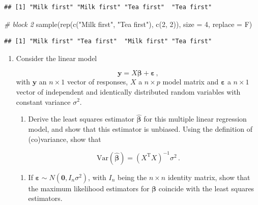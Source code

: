 \documentclass[
]{book}
\newenvironment{Shaded}{\begin{snugshade}}{\end{snugshade}}
\newcommand{\AttributeTok}[1]{\textcolor[rgb]{0.77,0.63,0.00}{#1}}
\newcommand{\CommentTok}[1]{\textcolor[rgb]{0.56,0.35,0.01}{\textit{#1}}}
\newcommand{\DecValTok}[1]{\textcolor[rgb]{0.00,0.00,0.81}{#1}}
\newcommand{\FunctionTok}[1]{\textcolor[rgb]{0.00,0.00,0.00}{#1}}
\newcommand{\NormalTok}[1]{#1}
\newcommand{\StringTok}[1]{\textcolor[rgb]{0.31,0.60,0.02}{#1}}
\providecommand{\tightlist}{%
  \setlength{\itemsep}{0pt}\setlength{\parskip}{0pt}}
\theoremstyle{definition}
\theoremstyle{definition}
\theoremstyle{definition}
\theoremstyle{definition}
\theoremstyle{remark}
\begin{document}
\begin{enumerate}
\begin{verbatim}
## [1] "Milk first" "Milk first" "Tea first"  "Tea first"
\end{verbatim}

\begin{Shaded}
\begin{Highlighting}[]
\CommentTok{\# block 2}
\FunctionTok{sample}\NormalTok{(}\FunctionTok{rep}\NormalTok{(}\FunctionTok{c}\NormalTok{(}\StringTok{"Milk first"}\NormalTok{, }\StringTok{"Tea first"}\NormalTok{), }\FunctionTok{c}\NormalTok{(}\DecValTok{2}\NormalTok{, }\DecValTok{2}\NormalTok{)), }\AttributeTok{size =} \DecValTok{4}\NormalTok{, }\AttributeTok{replace =}\NormalTok{ F)}
\end{Highlighting}
\end{Shaded}

\begin{verbatim}
## [1] "Milk first" "Tea first"  "Milk first" "Tea first"
\end{verbatim}
\end{enumerate}

\begin{enumerate}
\def\labelenumi{\arabic{enumi}.}
\setcounter{enumi}{1}
\item
  Consider the linear model

  \[\boldsymbol{y}= X\boldsymbol{\beta}+ \boldsymbol{\varepsilon}\,,\]
  with \(\boldsymbol{y}\) an \(n\times 1\) vector of responses, \(X\) a \(n\times p\) model matrix and \(\boldsymbol{\varepsilon}\) a \(n\times 1\) vector of independent and identically distributed random variables with constant variance \(\sigma^2\).

  \begin{enumerate}
  \def\labelenumii{\alph{enumii}.}
  \tightlist
  \item
    Derive the least squares estimator \(\hat{\boldsymbol{\beta}}\) for this multiple linear regression model, and show that this estimator is unbiased. Using the definition of (co)variance, show that
  \end{enumerate}

  \[\mbox{Var}(\hat{\boldsymbol{\beta}}) = \left(X^{\mathrm{T}}X\right)^{-1}\sigma^2\,.\]

  \begin{enumerate}
  \def\labelenumii{\alph{enumii}.}
  \setcounter{enumii}{1}
  \tightlist
  \item
    If \(\boldsymbol{\varepsilon}\sim N (\boldsymbol{0},I_n\sigma^2)\), with \(I_n\) being the \(n\times n\) identity matrix, show that the maximum likelihood estimators for \(\boldsymbol{\beta}\) coincide with the least squares estimators.
  \end{enumerate}
\end{enumerate}
\end{document}

